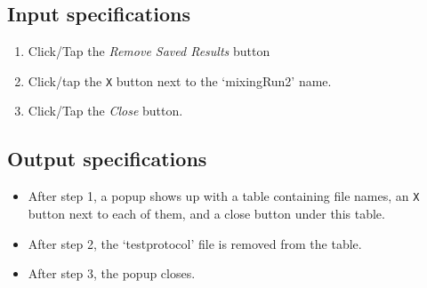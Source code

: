 \subsection*{Input specifications}
\begin{enumerate}
\item Click/Tap the \emph{Remove Saved Results} button
\item Click/tap the \texttt{X} button next to the `mixingRun2' name.
\item Click/Tap the \emph{Close} button.
\end{enumerate}

\subsection*{Output specifications}
\begin{itemize}
\item After step 1, a popup shows up with a table containing file names, an \texttt{X} button next to each of them, and a close button under this table.
\item After step 2, the `testprotocol' file is removed from the table.
\item After step 3, the popup closes.
\end{itemize}